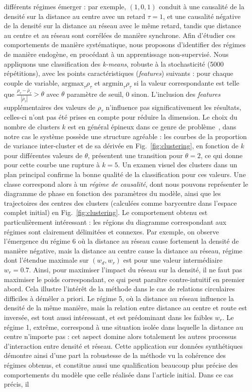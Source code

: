 \documentclass[english]{./sageo}
\begin{document}
différents régimes émerger : par exemple, $(1,0,1)$ conduit à une causalité de la densité sur la distance au centre avec un retard $\tau=1$, et une causalité négative de la densité sur la distance au réseau avec le même retard, tandis que distance au centre et au réseau sont corrélées de manière synchrone. Afin d'étudier ces comportements de manière systématique, nous proposons d'identifier des régimes de manière endogène, en procédant à un apprentissage non-supervisé. Nous appliquons une classification des \emph{k-means}, robuste à la stochasticité (5000 répétitions), avec les points caractéristiques (\emph{features}) suivants : pour chaque couple de variable, $\textrm{argmax}_{\tau} \rho_{\tau}$ et $\textrm{argmin}_{\tau} \rho_{\tau}$ si la valeur correspondante est telle que $\frac{\rho_{\tau}-\bar{\rho}_{\tau}}{\left|\bar{\rho}_{\tau}\right|} > \theta$ avec $\theta$ paramètre de seuil, 0 sinon. L'inclusion des \emph{features} supplémentaires des valeurs de $\rho_{\tau}$ n'influence pas significativement les résultats, celles-ci n'ont pas été prises en compte pour réduire la dimension. Le choix du nombre de clusters $k$ est en général épineux dans ce genre de problème~\cite{hamerly2003learning}, dans notre cas le système possède une structure agréable : les courbes de la proportion de variance inter-cluster et de sa dérivée en Fig.~\ref{fig:clustering}, en fonction de $k$ pour différentes valeurs de $\theta$, présentent une transition pour $\theta = 2$, ce qui donne pour cette courbe une rupture à $k=5$. Un examen visuel des clusters dans un plan principal confirme la bonne qualité de la classification pour ces valeurs. Une classe correspond alors à un \emph{régime de causalité}, dont nous pouvons représenter le diagramme de phase en fonction des paramètres du modèle, ainsi que les trajectoires des centres des clusters (calculées comme barycentre dans l'espace complet initial) en Fig.~\ref{fig:clustering}. Le comportement obtenu est particulièrement intéressant : les régions du diagramme correspondant aux régimes sont clairement délimitées et connexes. Par exemple, on observe l'émergence du régime 6 où la distance au réseau cause fortement la densité de manière négative, mais la distance au centre cause la distance au réseau, régime dont l'étendue maximale sur $(w_d,w_r)$ est pour une valeur intermédiaire $w_r=0.7$. Ainsi, pour maximiser l'impact du réseau sur la densité, il ne faut pas maximiser le poids correspondant, ce qui peut paraître contre-intuitif en premier abord. Cela illustre l'intérêt de la méthode dans le cas de relations circulaires difficiles à démêler a priori. Le régime 5, où la distance au réseau influence la densité de la même manière, mais la relation entre distance au centre et route est inversée, est tout aussi intéressant, et est prédominant dans les faibles $w_r$. Le régime 1, extrême, correspond à une situation isolée dans laquelle la distance au centre n'importe pas : cet aspect domine alors totalement les autres processus d'interaction entre densité et réseau. Cette application sur données synthétiques démontre ainsi d'une part la robustesse de la méthode vu la cohérence des régimes obtenus, et constitue aussi une qualification beaucoup plus précise des comportements du modèle que celle réalisée dans l'article initial. Dans ce cas précis, il 
\end{document}
